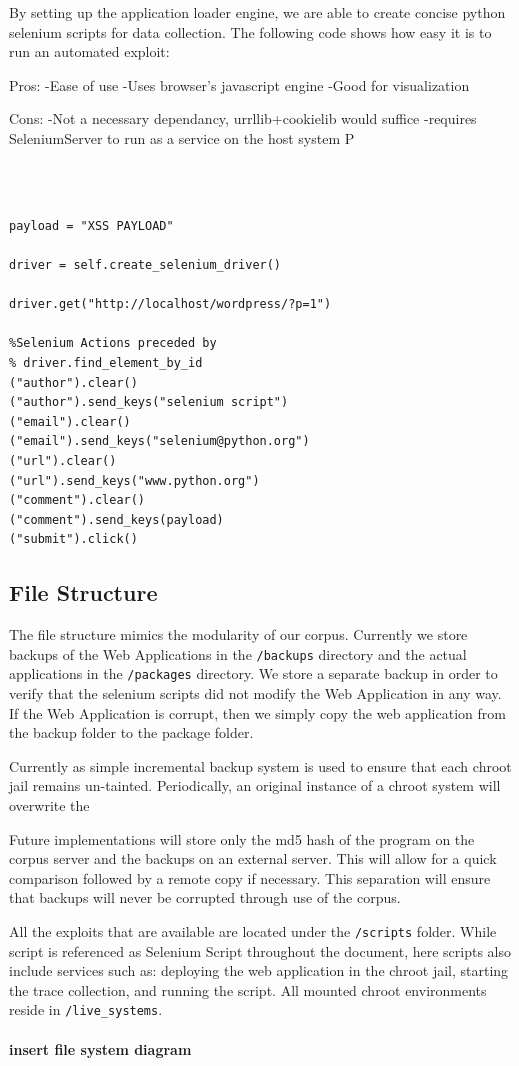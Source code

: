 \documentclass[letterpaper,twocolumn,10pt]{article}
\begin{document}
By setting up the application loader engine, we are able to create concise python selenium scripts for data collection.  The following code shows how easy it is to run an automated exploit:

Pros:
-Ease of use
-Uses browser's javascript engine
-Good for visualization

Cons:
-Not a necessary dependancy, urrllib+cookielib would suffice
-requires SeleniumServer to run as a service on the host system
P

{\tt \footnotesize
\begin{verbatim}

payload = "XSS PAYLOAD"

driver = self.create_selenium_driver()

driver.get("http://localhost/wordpress/?p=1")

%Selenium Actions preceded by
% driver.find_element_by_id
("author").clear()
("author").send_keys("selenium script")
("email").clear()
("email").send_keys("selenium@python.org")
("url").clear()
("url").send_keys("www.python.org")
("comment").clear()
("comment").send_keys(payload)
("submit").click()

\end{verbatim}}


\subsection{File Structure}

The file structure mimics the modularity of our corpus.  Currently we store backups of the Web Applications in the {\tt/backups} directory and the actual applications in the {\tt/packages} directory.  We store a separate backup in order to verify that the selenium scripts did not modify the Web Application in any way.  If the Web Application is corrupt, then we simply copy the web application from the backup folder to the package folder.  

Currently as simple incremental backup system is used to ensure that each chroot jail remains un-tainted. Periodically, an original instance of a chroot system will overwrite the 

Future implementations will store only the md5 hash of the program on the corpus server and the backups on an external server.  This will allow for a quick comparison followed by a remote copy if necessary.  This separation will ensure that backups will never be corrupted through use of the corpus.  

All the exploits that are available are located under the {\tt /scripts} folder.  While script is referenced as Selenium Script throughout the document, here scripts also include services such as: deploying the web application in the chroot jail, starting the trace collection, and running the script. All mounted chroot environments reside in {\tt /live\_systems}. 
\\\\
{\bf insert file system diagram}
\end{document}
